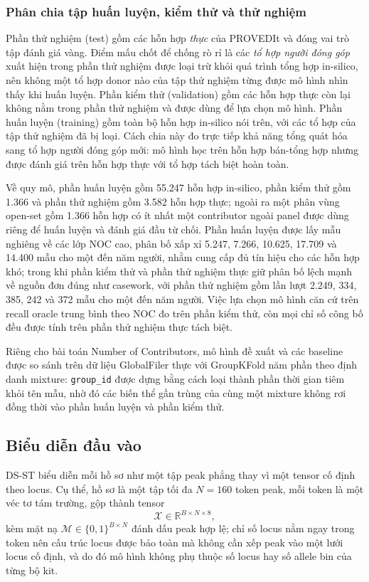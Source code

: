 \documentclass[12pt,a4paper]{article}
\begin{document}
\subsubsection{Phân chia tập huấn luyện, kiểm thử và thử nghiệm}

Phần thử nghiệm (test) gồm các hỗn hợp \emph{thực} của PROVEDIt và đóng vai trò tập đánh giá vàng. Điểm mấu chốt để chống rò rỉ là các \emph{tổ hợp người đóng góp} xuất hiện trong phần thử nghiệm được loại trừ khỏi quá trình tổng hợp in-silico, nên không một tổ hợp donor nào của tập thử nghiệm từng được mô hình nhìn thấy khi huấn luyện. Phần kiểm thử (validation) gồm các hỗn hợp thực còn lại không nằm trong phần thử nghiệm và được dùng để lựa chọn mô hình. Phần huấn luyện (training) gồm toàn bộ hỗn hợp in-silico nói trên, với các tổ hợp của tập thử nghiệm đã bị loại. Cách chia này đo trực tiếp khả năng tổng quát hóa sang tổ hợp người đóng góp mới: mô hình học trên hỗn hợp bán-tổng hợp nhưng được đánh giá trên hỗn hợp thực với tổ hợp tách biệt hoàn toàn.

Về quy mô, phần huấn luyện gồm 55.247 hỗn hợp in-silico, phần kiểm thử gồm 1.366 và phần thử nghiệm gồm 3.582 hỗn hợp thực; ngoài ra một phân vùng open-set gồm 1.366 hỗn hợp có ít nhất một contributor ngoài panel được dùng riêng để huấn luyện và đánh giá đầu từ chối. Phần huấn luyện được lấy mẫu nghiêng về các lớp NOC cao, phân bố xấp xỉ 5.247, 7.266, 10.625, 17.709 và 14.400 mẫu cho một đến năm người, nhằm cung cấp đủ tín hiệu cho các hỗn hợp khó; trong khi phần kiểm thử và phần thử nghiệm thực giữ phân bố lệch mạnh về nguồn đơn đúng như casework, với phần thử nghiệm gồm lần lượt 2.249, 334, 385, 242 và 372 mẫu cho một đến năm người. Việc lựa chọn mô hình căn cứ trên recall oracle trung bình theo NOC đo trên phần kiểm thử, còn mọi chỉ số công bố đều được tính trên phần thử nghiệm thực tách biệt.

Riêng cho bài toán Number of Contributors, mô hình đề xuất và các baseline được so sánh trên dữ liệu GlobalFiler thực với GroupKFold năm phần theo định danh mixture: \texttt{group\_id} được dựng bằng cách loại thành phần thời gian tiêm khỏi tên mẫu, nhờ đó các biến thể gần trùng của cùng một mixture không rơi đồng thời vào phần huấn luyện và phần kiểm thử.

\subsection{Biểu diễn đầu vào}

DS-ST biểu diễn mỗi hồ sơ như một tập peak phẳng thay vì một tensor cố định theo locus. Cụ thể, hồ sơ là một tập tối đa \(N=160\) token peak, mỗi token là một véc tơ tám trường, gộp thành tensor
\begin{equation}
\mathcal{X}\in\mathbb{R}^{B\times N\times 8},
\end{equation}
kèm mặt nạ \(\mathcal{M}\in\{0,1\}^{B\times N}\) đánh dấu peak hợp lệ; chỉ số locus nằm ngay trong token nên cấu trúc locus được bảo toàn mà không cần xếp peak vào một lưới locus cố định, và do đó mô hình không phụ thuộc số locus hay số allele bin của từng bộ kit.
\end{document}
